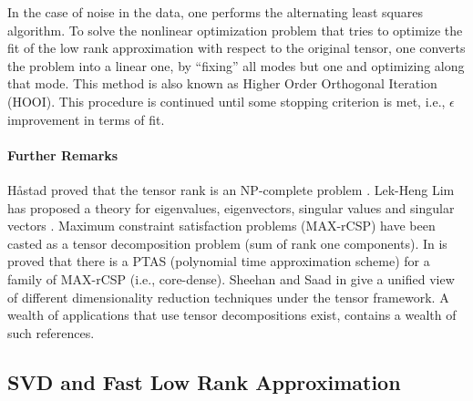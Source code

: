 In the case of noise in the data, one performs the alternating least squares algorithm. 
To solve the nonlinear optimization problem that tries to optimize the fit of the low rank approximation
with respect to the original tensor, one converts the problem into a linear one, by ``fixing'' all modes
but one and optimizing along that mode. This method is also known as Higher Order Orthogonal Iteration (HOOI). 
This procedure is continued until some stopping criterion is met, i.e., $\epsilon$ improvement in terms of fit.


\paragraph{Further Remarks}
H{\aa}stad proved that the tensor rank is an NP-complete problem \cite{DBLP:journals/jal/Hastad90}.
Lek-Heng Lim has proposed a theory for eigenvalues, eigenvectors, singular values  and singular vectors
\cite{DBLP:journals/corr/abs-math-0607648}. Maximum constraint satisfaction problems  (MAX-rCSP)
have been casted as a tensor decomposition problem (sum of rank one components).
In \cite{1060701} is proved that there is a PTAS (polynomial time approximation scheme) for a family 
of MAX-rCSP (i.e., core-dense). Sheehan and Saad in \cite{saad} give a unified view of different
dimensionality reduction techniques under the tensor framework.
A wealth of applications that use tensor decompositions exist, \cite{tamarasurvey} contains a wealth of such references.




\subsection{SVD and Fast Low Rank Approximation} 

